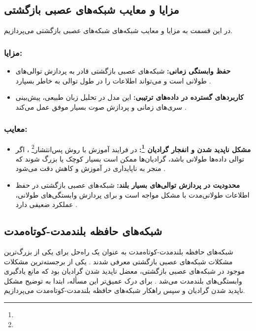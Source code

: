 \subsection{مزایا و معایب شبکه‌های عصبی بازگشتی}
در این قسمت به مزایا و معایب شبکه‌های شبکه‌های عصبی بازگشتی می‌پردازیم.

\subsubsection{مزایا:}
\begin{itemize}
	\item \textbf{حفظ وابستگی زمانی:}  
شبکه‌های عصبی بازگشتی قادر به پردازش توالی‌های طولانی است و می‌تواند اطلاعات را در طول توالی به خاطر بسپارد
	\cite{elman1990finding}.
	
	\item \textbf{کاربردهای گسترده در داده‌های ترتیبی:}  
	این مدل در تحلیل زبان طبیعی، پیش‌بینی سری‌های زمانی و پردازش صوت بسیار موفق عمل می‌کند
	\cite{gers1999learning}.
\end{itemize}

\subsubsection{معایب:}
\begin{itemize}
\item \textbf{مشکل ناپدید شدن و انفجار گرادیان \footnote{}:}
در فرایند آموزش با روش پس‌انتشار\footnote{} ، اگر توالی داده‌ها طولانی باشد، گرادیان‌ها ممکن است بسیار کوچک یا بزرگ شوند که منجر به ناپایداری در آموزش و کاهش دقت می‌شود
	\cite{hochreiter1998vanishing}.
	
	\item \textbf{محدودیت در پردازش توالی‌های بسیار بلند:}  
 شبکه‌های عصبی بازگشتی در حفظ اطلاعات طولانی‌مدت با مشکل مواجه است و برای پردازش وابستگی‌های طولانی، عملکرد ضعیفی دارد
	\cite{hochreiter1997long,goodfellow2016deep}.
\end{itemize}

\subsection{شبکه‌های حافظه بلندمدت-کوتاه‌مدت}

شبکه‌های حافظه بلندمدت-کوتاه‌مدت به عنوان یک راه‌حل برای یکی از بزرگ‌ترین مشکلات شبکه‌های عصبی بازگشتی معرفی شدند
\cite{hochreiter1997long}.
یکی از برجسته‌ترین مشکلات موجود در شبکه‌های عصبی بازگشتی، معضل ناپدید شدن گرادیان  بود که مانع یادگیری وابستگی‌های بلندمدت می‌شد
\cite{hochreiter1998vanishing,goodfellow2016deep}.
برای درک عمیق‌تر این مسأله، ابتدا به توضیح مشکل ناپدید شدن گرادیان و سپس راهکار شبکه‌های حافظه بلندمدت-کوتاه‌مدت می‌پردازیم.

